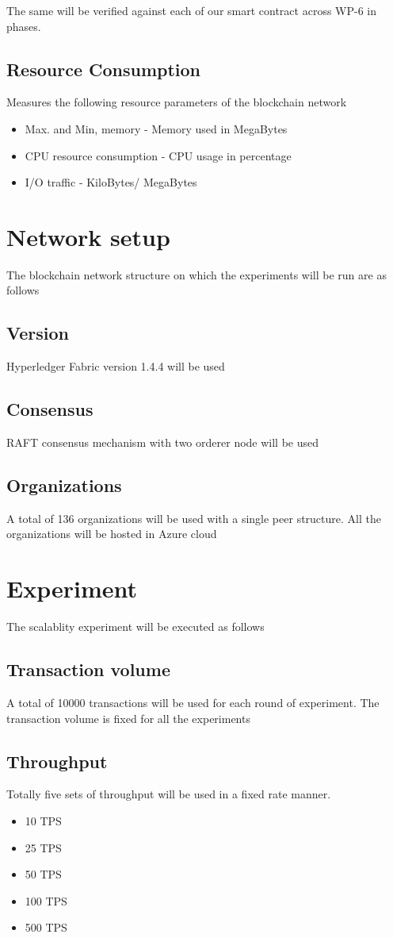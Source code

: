 \documentclass{ceadar_article}
\begin{document}
The same will be verified against each of our smart contract across WP-6 in phases.

\subsection{Resource Consumption} Measures the following resource parameters of the blockchain network
\begin{itemize}
    \item Max. and Min, memory - Memory used in MegaBytes
    \item CPU resource consumption - CPU usage in percentage
    \item I/O traffic - KiloBytes/ MegaBytes
\end{itemize}

\section{Network setup}
The blockchain network structure on which the experiments will be run are as follows
\subsection{Version}
Hyperledger Fabric version 1.4.4 will be used
\subsection {Consensus}
RAFT consensus mechanism with two orderer node will be used
\subsection {Organizations}
A total of 136 organizations will be used with a single peer structure. All the organizations will be hosted in Azure cloud 

\section{Experiment}
The scalablity experiment will be executed as follows

\subsection {Transaction volume}
A total of 10000 transactions will be used for each round of experiment. The transaction volume is fixed for all the experiments

\subsection {Throughput}
Totally five sets of throughput will be used in a fixed rate manner. 
\begin{itemize}
    \item 10 TPS
    \item 25 TPS
    \item 50 TPS
    \item 100 TPS
    \item 500 TPS
\end{itemize}
\end{document}
